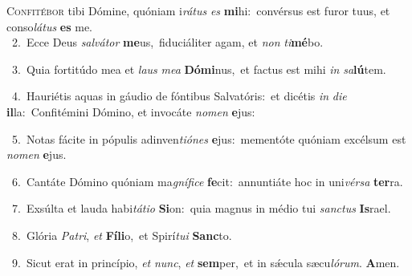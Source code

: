 \lettrine{\initial\textcolor{\initialcolor}{C}}{onfitébor} tibi Dómine, quóniam i\-\textit{rá}\-\textit{tus} \textit{es} \textbf{mi}\-hi:~\star convérsus est furor tuus, et conso\-\textit{lá}\-\textit{tus} \textbf{es} me.\\
{\numbfont\textcolor{\numbcolor}{~2.}}~Ecce Deus \textit{sal}\-\textit{vá}\textit{tor} \textbf{me}\-us,~\star fiduciáliter agam, et \textit{non} \textit{ti}\-\textbf{mé}bo.\par
{\numbfont\textcolor{\numbcolor}{~3.}}~Quia fortitúdo mea et \textit{laus} \textit{me}\-\textit{a} \textbf{Dó}\-\textbf{mi}nus,~\star et factus est mihi \textit{in} \textit{sa}\-\textbf{lú}tem.\par
{\numbfont\textcolor{\numbcolor}{~4.}}~Hauriétis aquas in gáudio de fóntibus Salvatóris:~\dagger et dicétis \textit{in} \textit{di}\-\textit{e} \textbf{il}\-la:~\star Confitémini Dómino, et invocáte \textit{no}\-\textit{men} \textbf{e}\-jus:\par
{\numbfont\textcolor{\numbcolor}{~5.}}~Notas fácite in pópulis adinven\-\textit{ti}\-\textit{ó}\textit{nes} \textbf{e}\-jus:~\star mementóte quóniam excélsum est \textit{no}\-\textit{men} \textbf{e}\-jus.\par
{\numbfont\textcolor{\numbcolor}{~6.}}~Cantáte Dómino quóniam ma\-\textit{gní}\-\textit{fi}\textit{ce} \textbf{fe}\-cit:~\star annuntiáte hoc in uni\-\textit{vér}\-\textit{sa} \textbf{ter}\-ra.\par
{\numbfont\textcolor{\numbcolor}{~7.}}~Exsúlta et lauda habi\-\textit{tá}\-\textit{ti}\textit{o} \textbf{Si}\-on:~\star quia magnus in médio tui \textit{sanc}\-\textit{tus} \textbf{Is}\-rael.\par
{\numbfont\textcolor{\numbcolor}{~8.}}~Glória \textit{Pa}\-\textit{tri}, \textit{et} \textbf{Fí}\-\textbf{li}o,~\star et Spirí\-\textit{tu}\-\textit{i} \textbf{Sanc}\-to.\par
{\numbfont\textcolor{\numbcolor}{~9.}}~Sicut erat in princípio, \textit{et} \textit{nunc}\-, \textit{et} \textbf{sem}\-per,~\star et in sǽcula sæcu\-\textit{ló}\-\textit{rum}. \textbf{A}\-men.\par
